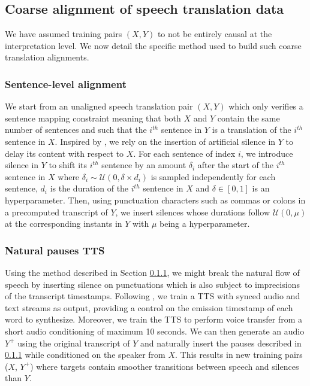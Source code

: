 \subsection{Coarse alignment of speech translation data}
\label{sec:synth_st_data}

We have assumed training pairs $(X, Y)$ to not be entirely causal at the interpretation level. We now detail the specific method used to build such coarse translation alignments.

\subsubsection{Sentence-level alignment}
\label{sec:sent_level_align}

We start from an unaligned speech translation pair $(X, Y)$ which only verifies a sentence mapping constraint meaning that both $X$ and $Y$ contain the same number of sentences and such that the $i^{th}$ sentence in $Y$ is a translation of the $i^{th}$ sentence in $X$. Inspired by \citet{hibiki}, we rely on the insertion of artificial silence in $Y$ to delay its content with respect to $X$.  For each sentence of index $i$, we introduce silence in $Y$ to shift its $i^{th}$ sentence by an amount $\delta_i$ after the start of the $i^{th}$ sentence in $X$ where $\delta_i \sim \mathcal{U}(0,\delta \times d_{i})$ is sampled independently for each sentence, $d_{i}$ is the duration of the $i^{th}$ sentence in $X$ and $\delta \in [0,1]$ is an hyperparameter. Then, using punctuation characters such as commas or colons in a precomputed transcript of $Y$, we insert silences whose durations follow $\mathcal{U}(0,\mu)$ at the corresponding instants in $Y$ with $\mu$ being a hyperparameter.

\subsubsection{Natural pauses TTS}
\label{sec:nat_pauses_tts}

Using the method described in Section \ref{sec:sent_level_align}, we might break the natural flow of speech by inserting silence on punctuations which is also subject to imprecisions of the transcript timestamps. Following \citet{dsm}, we train a TTS with synced audio and text streams as output, providing a control on the emission timestamp of each word to synthesize. Moreover, we train the TTS to perform voice transfer from a short audio conditioning of maximum 10 seconds. We can then generate an audio $Y^+$ using the original transcript of $Y$ and naturally insert the pauses described in \ref{sec:sent_level_align} while conditioned on the speaker from $X$. This results in new training pairs ($X$, $Y^+$) where targets contain smoother transitions between speech and silences than $Y$.


